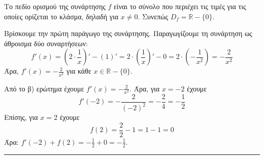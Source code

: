 \begin{alist}
\item Το πεδίο ορισμού της συνάρτησης $f$ είναι το σύνολο που περιέχει τις τιμές για τις οποίες ορίζεται το κλάσμα, δηλαδή για $x \neq 0$. Συνεπώς $D_f = \mathbb{R} - \{0\}$.
\item Βρίσκουμε την πρώτη παράγωγο της συνάρτησης.
Παραγωγίζουμε τη συνάρτηση ως άθροισμα δύο συναρτήσεων:
\[ f'(x) = \left(2 \cdot \frac{1}{x}\right)' - (1)' = 2 \cdot \left(\frac{1}{x}\right)' - 0 = 2 \cdot \left(-\frac{1}{x^2}\right) = -\frac{2}{x^2} \]
Άρα, $f'(x) = -\frac{2}{x^2}$ για κάθε $x \in \mathbb{R} - \{0\}$.
\item Από το β) ερώτημα έχουμε $f'(x) = -\frac{2}{x^2}$.
Άρα, για $x=-2$ έχουμε
\[ f'(-2) = -\frac{2}{(-2)^2} = -\frac{2}{4} = -\frac{1}{2} \]
Επίσης, για $x=2$ έχουμε
\[ f(2) = \frac{2}{2} - 1 = 1 - 1 = 0 \]
Άρα: $f'(-2) + f(2) = -\frac{1}{2} + 0 = -\frac{1}{2}$.
\end{alist}
\vspace{6mm}
\noindent\rule{\textwidth}{0.4pt}
\vspace{6mm}

